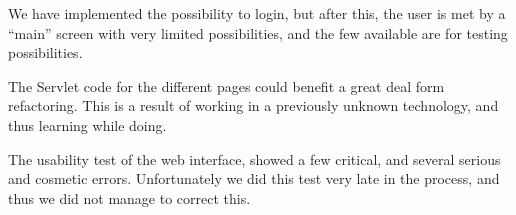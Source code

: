 We have implemented the possibility to login, but after this, the user is met by a ``main'' screen with very limited possibilities, and the few available are for testing possibilities.

The Servlet code for the different pages could benefit a great deal form refactoring. This is a result of working in a previously unknown technology, and thus learning while doing.

The usability test of the web interface, showed a few critical, and several serious and cosmetic errors. Unfortunately we did this test very late in the process, and thus we did not manage to correct this.
	

